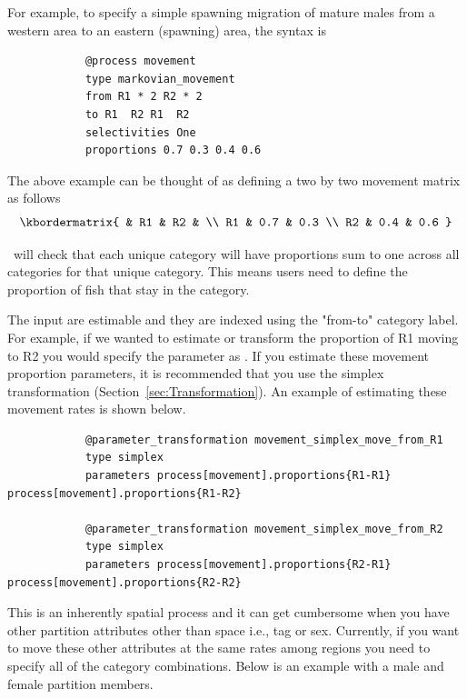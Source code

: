 For example, to specify a simple spawning migration of mature males from a western area to an eastern (spawning) area, the syntax is

{\small{\begin{verbatim}
			@process movement
			type markovian_movement
			from R1 * 2 R2 * 2
			to R1  R2 R1  R2
			selectivities One
			proportions 0.7 0.3 0.4 0.6
\end{verbatim}}}

The above example can be thought of as defining a two by two movement matrix as follows
\[
 \kbordermatrix{
	& R1 & R2 & \\
	R1 & 0.7 & 0.3  \\
	R2 & 0.4  & 0.6
}
\]

\CNAME\ will check that each unique  category will have proportions sum to one across all  categories for that unique  category. This means users need to define the proportion of fish that stay in the  category.

The input  are estimable and they are indexed using the "from-to" category label. For example, if we wanted to estimate or transform the proportion of R1 moving to R2 you would specify the parameter as . If you estimate these movement proportion parameters, it is recommended that you use the simplex transformation (Section~\ref{sec:Transformation}). An example of estimating these movement rates is shown below.

{\small{\begin{verbatim}
			@parameter_transformation movement_simplex_move_from_R1
			type simplex
			parameters process[movement].proportions{R1-R1} process[movement].proportions{R1-R2}
			
			@parameter_transformation movement_simplex_move_from_R2
			type simplex
			parameters process[movement].proportions{R2-R1} 		process[movement].proportions{R2-R2}			
\end{verbatim}}}

This is an inherently spatial process and it can get cumbersome when you have other partition attributes other than space i.e., tag or sex. Currently, if you want to move these other attributes at the same rates among regions you need to specify all of the category combinations. Below is an example with a male and female partition members.

